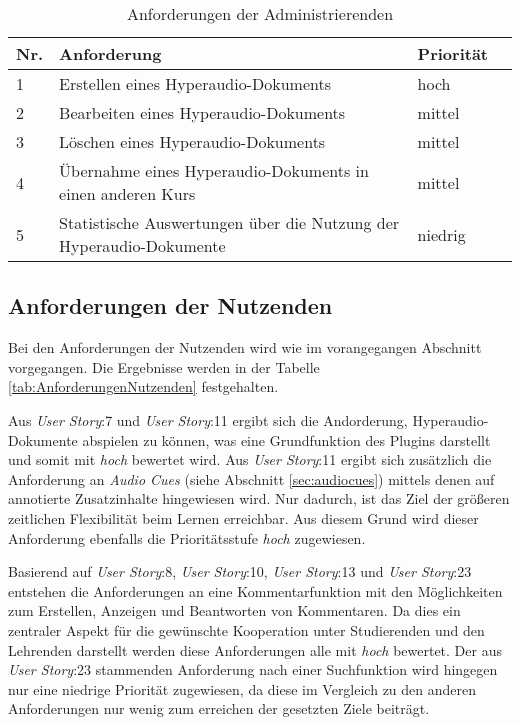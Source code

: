 \begin{table}[!ht]
\def\arraystretch{1.4}
\caption{Anforderungen der Administrierenden}
\label{tab:AnforderungenAdministrierenden}
 \begin{tabularx}{\textwidth}{lXll}      
    \hline
    Nr. & Anforderung & Priorität
    \\\hline
    1 & Erstellen eines Hyperaudio-Dokuments & hoch\\
    2 & Bearbeiten eines Hyperaudio-Dokuments & mittel\\
    3 & Löschen eines Hyperaudio-Dokuments & mittel\\
    4 & Übernahme eines Hyperaudio-Dokuments in einen anderen Kurs & mittel\\
    5 & Statistische Auswertungen über die Nutzung der Hyperaudio-Dokumente & niedrig\\
    \hline
    \end{tabularx}
\end{table}


\subsection{Anforderungen der Nutzenden}
Bei den Anforderungen der Nutzenden wird wie im vorangegangen Abschnitt vorgegangen. Die Ergebnisse werden in der Tabelle \ref{tab:AnforderungenNutzenden} festgehalten.

Aus \textit{User Story}:7 und \textit{User Story}:11 ergibt sich die Andorderung, Hyperaudio-Dokumente abspielen zu können, was eine Grundfunktion des Plugins darstellt und somit mit \textit{hoch} bewertet wird. Aus \textit{User Story}:11 ergibt sich zusätzlich die Anforderung an \textit{Audio Cues} (siehe Abschnitt \ref{sec:audiocues}) mittels denen auf annotierte Zusatzinhalte hingewiesen wird. Nur dadurch, ist das Ziel der größeren zeitlichen Flexibilität beim Lernen erreichbar. Aus diesem Grund wird dieser Anforderung ebenfalls die Prioritätsstufe \textit{hoch} zugewiesen.


Basierend auf \textit{User Story}:8, \textit{User Story}:10, \textit{User Story}:13 und \textit{User Story}:23 entstehen die Anforderungen an eine Kommentarfunktion mit den Möglichkeiten zum Erstellen, Anzeigen und Beantworten von Kommentaren. Da dies ein zentraler Aspekt für die gewünschte Kooperation unter Studierenden und den Lehrenden darstellt werden diese Anforderungen alle mit \textit{hoch} bewertet. Der aus \textit{User Story}:23 stammenden Anforderung nach einer Suchfunktion wird hingegen nur eine niedrige Priorität zugewiesen, da diese im Vergleich zu den anderen Anforderungen nur wenig zum erreichen der gesetzten Ziele beiträgt.

